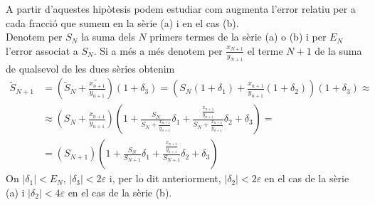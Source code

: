 \documentclass[a4paper,10pt]{article}
\renewcommand{\*}{\cdot}
\renewcommand{\epsilon}{\varepsilon}
\begin{document}
A partir d'aquestes hipòtesis podem estudiar com augmenta l'error relatiu per a cada fracció que sumem en la sèrie (a) i en el cas (b).\\
Denotem per $S_N$ la suma dels $N$ primers termes de la sèrie (a) o (b) i per $E_N$ l'error associat a $S_N$. Si a més a més denotem per $\frac{x_{N+1}}{y_{N+1}}$ el terme
$N+1$ de la suma de qualsevol de les dues sèries obtenim
\begin{equation*}
\begin{split}
\tilde{S}_{N+1} &=\left(\tilde{S}_{N}+\tilde{\frac{x_{n+1}}{y_{n+1}}}\right)(1+\delta_3)=\left(S_N(1+\delta_1)+\frac{x_{n+1}}{y_{n+1}}(1+\delta_2)\right)(1+\delta_3)\approx\\
&\approx\left(S_N+\frac{x_{n+1}}{y_{n+1}}\right)\left(1+\frac{S_N}{S_N+\frac{x_{n+1}}{y_{n+1}}}\delta_1+\frac{\frac{x_{n+1}}{y_{n+1}}}{S_N+\frac{x_{n+1}}{y_{n+1}}}
\delta_2+\delta_3\right)=\\
&=(S_{N+1})\left(1+\frac{S_N}{S_{N+1}}\delta_1+\frac{\frac{x_{n+1}}{y_{n+1}}}{S_{N+1}}
\delta_2+\delta_3\right)
\end{split}
\end{equation*}
On $|\delta_1|<E_N$, $|\delta_3|<2\epsilon$ i, per lo dit anteriorment, $|\delta_2|<2\epsilon$ en el cas de la sèrie (a) i $|\delta_2|<4\epsilon$ en el cas de la sèrie (b).
\end{document}
